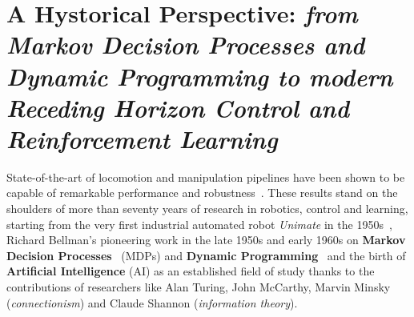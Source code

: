\section{A Hystorical Perspective: \textnormal{\textit{from Markov Decision Processes and Dynamic Programming to modern Receding Horizon Control and Reinforcement Learning}}}
State-of-the-art of locomotion and manipulation pipelines have been shown to be capable of remarkable performance and robustness~\cite{rl:schneider2023learning,rl:miki2024learning,web::atlas_grip_boston_dyn,web::lrhc_boston_dyn}. These results stand on the shoulders of more than seventy years of research in robotics, control and learning, starting from the very first industrial automated robot \textit{Unimate} in the 1950s~\cite{origins:xu2018fourth}, Richard Bellman's pioneering work in the late 1950s and early 1960s on \textbf{Markov Decision Processes}~\cite{rl:bellman1957markovian} (MDPs) and \textbf{Dynamic Programming}~\cite{rl:bellman1960dynamic} and the birth of \textbf{Artificial Intelligence} (AI) as an established field of study thanks to the contributions of researchers like Alan Turing, John McCarthy, Marvin Minsky (\textit{connectionism}) and Claude Shannon (\textit{information theory}).

